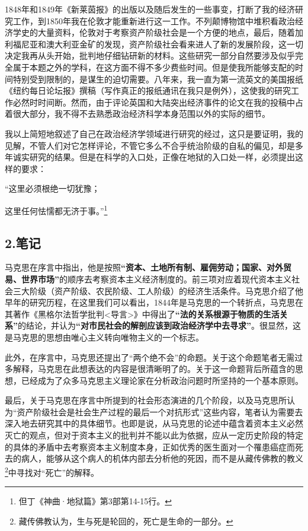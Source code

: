 \documentclass[a4paper,twoside,12pt,AutoFakeBold]{ctexart}
\begin{document}
1848年和1849年《新莱茵报》的出版以及随后发生的一些事变，打断了我的经济研究工作，到1850年我在伦敦才能重新进行这一工作。不列颠博物馆中堆积看政治经济学史的大量资料，伦敦对于考察资产阶级社会是一个方便的地点，最后，随着加利福尼亚和澳大利亚金矿的发现，资产阶级社会看来进人了新的发展阶段，这一切决定我再从头开始，批判地仔细钻研新的材料。这些研究一部分自然要涉及似乎完全属于本题之外的学科，在这方面不得不多少费些时间。但是使我所能够支配的时间特别受到限制的，是谋生的迫切需要。八年来，我一直为第一流英文的美国报纸《纽约每日论坛报》撰稿（写作真正的报纸通讯在我只是例外），这使我的研究工作必然时时间断。然而，由于评论英国和大陆突出经济事件的论文在我的投稿中占着很大部分，我不得不去熟悉政治经济科学本身范围以外的实际的细节。

我以上简短地叙述了自己在政治经济学领域进行研究的经过，这只是要证明，我的见解，不管人们对它怎样评论，不管它多么不合乎统治阶级的自私的偏见，却是多年诚实研究的结果。但是在科学的入口处，正像在地狱的入口处一样，必须提出这样的要求：

\begin{fangsong}
“这里必须根绝一切犹豫；

这里任何怯懦都无济于事。”\footnote{但丁《神曲·地狱篇》第3部第14-15行。} 
\end{fangsong}
\newpage
\subsection{2.笔记}
马克思在序言中指出，他是按照\textbf{“资本、土地所有制、雇佣劳动；国家、对外贸易、世界市场”}的顺序去考察资本主义经济制度的。前三项对应着现代资本主义社会三大阶级（资产阶级、农民阶级、工人阶级）的经济生活条件。马克思介绍了他早年的研究历程，在这里我们可以看出，1844年是马克思的一个转折点，马克思在其著作《黑格尔法哲学批判<导言>》中得出了\textbf{“法的关系根源于物质的生活关系”}的结论，并认为\textbf{“对市民社会的解剖应该到政治经济学中去寻求”}。很显然，这是马克思的思想由唯心主义转向唯物主义的一个标志。

此外，在序言中，马克思还提出了“两个绝不会”的命题。关于这个命题笔者无需过多解释，马克思在此想表达的内容是很清晰明了的。关于这一命题背后所蕴含的思想，已经成为了众多马克思主义理论家在分析政治问题时所坚持的一个基本原则。

最后，关于马克思在序言中所提到的社会形态演进的几个阶段，以及马克思所认为“资产阶级社会是社会生产过程的最后一个对抗形式”这些内容，笔者认为需要去深入地去研究其中的具体细节。也即是说，从马克思的论述中蕴含着资本主义必然灭亡的观点，但对于资本主义的批判并不能以此为依据，应从一定历史阶段的特定的具体的矛盾中去考察资本主义制度本身，正如优秀的医生面对一个罹患癌症而死去的病人，能够从这个病人的机体内部去分析他的死因，而不是从藏传佛教的教义\footnote{藏传佛教认为，生与死是轮回的，死亡是生命的一部分。}中寻找对“死亡”的解释。
\end{document}
